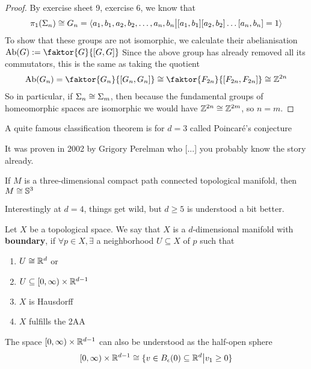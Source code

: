 \begin{proof}
By exercise sheet 9, exercise 6, we know that
\begin{align*}
  \pi_1(\Sigma_n) \cong G_n= \langle a_1,b_1,a_2,b_2, \ldots, a_n,b_n \big\vert[a_1,b_1][a_2,b_2]\dots[a_n,b_n] = 1\rangle 
\end{align*}
To show that these groups are not isomorphic, we calculate their abelianisation $\text{Ab}(G) := \faktor{G}{[G,G]}$
Since the above group has already removed all its commutators, this is the same as taking the quotient
\begin{align*}
  \text{Ab}(G_n) = \faktor{G_n}{[G_n,G_n]} \iso \faktor{F_{2n}}{[F_{2n},F_{2n}]} \iso \Z^{2n}
\end{align*}
So in particular, if $\Sigma_n \cong \Sigma_m$, then because the fundamental groups of homeomorphic spaces are isomorphic we would have $\mathbb{Z}^{2n} \cong \mathbb{Z}^{2m}$, so $n = m$.
\end{proof}


A quite famous classification theorem is for $d=3$ called Poincaré's conjecture

It was proven in 2002 by Grigory Perelman who [...] you probably know the story already.

\begin{thm}[Perelman]
If $M$ is a three-dimensional compact path connected topological manifold, then $M\cong \mathbb{S}^{3}$
\end{thm}

Interestingly at $d=4$, things get wild, but $d \geq 5$ is understood a bit better.


\begin{dfn}[]
Let $X$ be a topological space. We say that $X$ is a $d$-dimensional manifold with \textbf{boundary}, if
$\forall p \in X, \exists$ a neighborhood $U \subseteq X$ of $p$ such that
\begin{enumerate}
  \item $U \cong \mathbb{R}^{d}$ or
  \item $U \subseteq [0,\infty)  \times \mathbb{R}^{d-1}$ 
  \item $X$ is Hausdorff
  \item $X$ fulfills the 2AA
\end{enumerate}
\end{dfn}
The space $[0,\infty) \times \mathbb{R}^{d-1}$ can also be understood as the half-open sphere
\begin{align*}
  [0,\infty) \times \mathbb{R}^{d-1} \cong \{v \in B_{\epsilon}(0) \subseteq \mathbb{R}^{d} \big\vert v_1 \geq 0\}
\end{align*}

